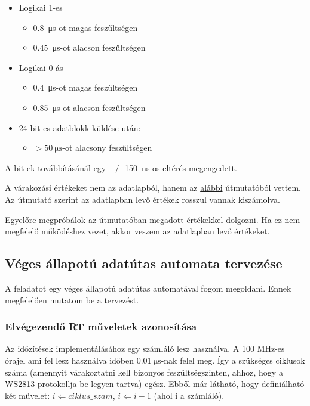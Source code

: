 \documentclass[10pt]{article} %
\begin{document}
\begin{itemize}
\item Logikai 1-es
	\begin{itemize}
	\item \SI{0.8}{\micro\second}-ot magas feszűltségen
	\item \SI{0.45}{\micro\second}-ot alacson feszűltségen
	\end{itemize}
\item Logikai 0-ás
	\begin{itemize}
	\item \SI{0.4}{\micro\second}-ot magas feszűltségen
	\item \SI{0.85}{\micro\second}-ot alacson feszűltségen
	\end{itemize}
\item 24 bit-es adatblokk küldése után: 
	\begin{itemize}
		\item $ > \SI{50}{\micro\second}$-ot alacsony feszűltségen
	\end{itemize}
\end{itemize}

\noindent A bit-ek továbbításánál egy +/- \SI{150}{\nano\second}-os eltérés megengedett.

A várakozási értékeket nem az adatlapból, hanem az \href{https://learn.adafruit.com/adafruit-neopixel-uberguide}{alábbi} útmutatóból vettem. Az útmutató szerint az adatlapban levő értékek rosszul vannak kiszámolva.

Egyelőre megpróbálok az útmutatóban megadott értékekkel dolgozni. Ha ez nem megfelelő működéshez vezet, akkor veszem az adatlapban levő értékeket.


\subsection{Véges állapotú adatútas automata tervezése}

A feladatot egy véges állapotú adatútas automatával fogom megoldani. Ennek megfelelően mutatom be a tervezést.

\subsubsection{Elvégezendő RT műveletek azonosítása}

Az időzítések implementálásához egy számláló lesz használva. A 100 MHz-es órajel ami fel lesz használva időben $\SI{0.01}{\micro\second}$-nak felel meg. 
Így a szükséges ciklusok száma (amennyit várakoztatni kell bizonyos feszűltségszinten, ahhoz, hogy a WS2813 protokollja be legyen tartva) egész.
Ebből már látható, hogy definiálható két művelet: $i \Leftarrow ciklus\_szam$, $i \Leftarrow i - 1$ (ahol i a számláló).
\end{document}
